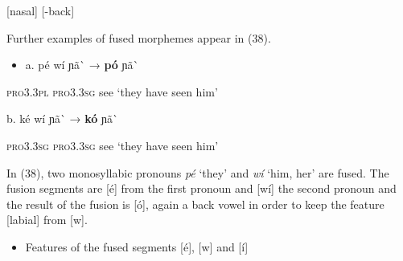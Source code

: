 \begin{styleindexi}
          [nasal]                           [-back]
\end{styleindexi}

\begin{styleindexi}

\end{styleindexi}

\begin{styleindexi}
\end{styleindexi}

Further examples of fused morphemes appear in (38). 

\begin{itemize}
\item \begin{styleindexi}
\label{bkm:Ref359911310}      a.     pé               wí               ɲã\`{}                 →          \textbf{pó}   ɲã\`{}  
\end{styleindexi}\end{itemize}
\begin{styleindexi}
                  \textsc{pro3.3pl}     \textsc{pro3.3sg}    see                          ‘they have seen him’       
\end{styleindexi}

\begin{styleindexi}
            b.     ké              wí              ɲã\`{}                 →          \textbf{kó}    ɲã\`{} 
\end{styleindexi}

\begin{styleindexi}
                  \textsc{pro3.3sg}     \textsc{pro3.3sg}    see                          ‘they have seen him’
\end{styleindexi}

In (38), two monosyllabic pronouns \textit{pé} ‘they’ and \textit{wí} ‘him, her’ are fused. The fusion segments are [é] from the first pronoun and [wí] the second pronoun and the result of the fusion is [ó], again a back vowel in order to keep the feature [labial] from [w]. 

\begin{itemize}
\item \begin{styleindexi}
   Features of the fused segments [é], [w] and [í]
\end{styleindexi}\end{itemize}
\begin{styleindexi}
          [é]               [w]                       [í]                    
\end{styleindexi}

